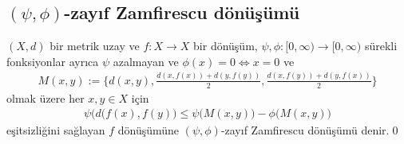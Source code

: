 \documentclass[8pt]{beamer}
\begin{document}
\subsection{$(\psi,\phi)$-zay\i f Zamfirescu d\"{o}n\"{u}\c{s}\"{u}m\"{u}}
\begin{frame}
  \begin{definition}
    $(X,d)$  bir metrik uzay ve $f: X \rightarrow X$ bir d\"{o}n\"{u}\c{s}\"{u}m, $\psi,\phi : [0,\infty)\to [0,\infty)$ s\"urekli fonksiyonlar ayr\i ca $\psi$ azalmayan ve $\phi(x)=0 \iff x=0$ ve
    \begin{align}
M(x,y):=\bigg\{ d(x,y), \frac{d(x,f(x))+d(y,f(y))}{2}, \frac{d(x,f(y))+d(y,f(x))}{2} \bigg\}
    \end{align}
olmak \"{u}zere her $x,y \in X$ i\c{c}in
\begin{align}
\psi\big(d(f(x),f(y)\big)\leq \psi\big(M(x,y)\big)-\phi\big(M(x,y)\big)
\end{align}
e\c{s}itsizli\u{g}ini sa\u{g}layan $f$ d\"{o}n\"{u}\c{s}\"{u}m\"une $(\psi,\phi)$-zay\i f Zamfirescu d\"{o}n\"{u}\c{s}\"{u}m\"{u} denir.\qed 
  \end{definition}
\end{frame}%
\end{document}
